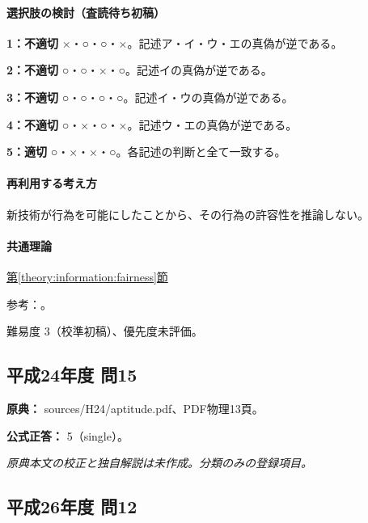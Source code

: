 \paragraph{選択肢の検討（査読待ち初稿）}\mbox{}\par

\noindent\textbf{1：不適切} ×・○・○・×。記述ア・イ・ウ・エの真偽が逆である。\par

\noindent\textbf{2：不適切} ○・○・×・○。記述イの真偽が逆である。\par

\noindent\textbf{3：不適切} ○・○・○・○。記述イ・ウの真偽が逆である。\par

\noindent\textbf{4：不適切} ○・×・○・×。記述ウ・エの真偽が逆である。\par

\noindent\textbf{5：適切} ○・×・×・○。各記述の判断と全て一致する。\par

\paragraph{再利用する考え方} 新技術が行為を可能にしたことから、その行為の許容性を推論しない。

\paragraph{共通理論} \hyperref[theory:information:fairness]{第\ref*{theory:information:fairness}節}

\par 参考：\cite{scj_code2006}。

\par 難易度 3（校準初稿）、優先度未評価。

\subsection{平成24年度 問15}
\label{q:h24-reg-apt-15}

\noindent\textbf{原典：} sources/H24/aptitude.pdf、PDF物理13頁。

\textbf{公式正答：} 5（single）。

\par\textit{原典本文の校正と独自解説は未作成。分類のみの登録項目。}

\subsection{平成26年度 問12}
\label{q:h26-reg-apt-12}

